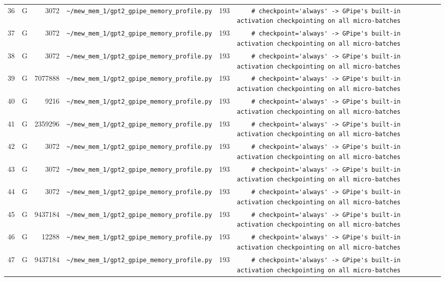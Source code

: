 \documentclass{article}
\begin{document}
\begin{longtable}{r l r p{6.5cm} r p{7.0cm}}
36 & G & 3072 & \lstinline|~/mew_mem_1/gpt2_gpipe_memory_profile.py| & 193 & \lstinline|    # checkpoint='always' -> GPipe's built-in activation checkpointing on all micro-batches| \\
37 & G & 3072 & \lstinline|~/mew_mem_1/gpt2_gpipe_memory_profile.py| & 193 & \lstinline|    # checkpoint='always' -> GPipe's built-in activation checkpointing on all micro-batches| \\
38 & G & 3072 & \lstinline|~/mew_mem_1/gpt2_gpipe_memory_profile.py| & 193 & \lstinline|    # checkpoint='always' -> GPipe's built-in activation checkpointing on all micro-batches| \\
39 & G & 7077888 & \lstinline|~/mew_mem_1/gpt2_gpipe_memory_profile.py| & 193 & \lstinline|    # checkpoint='always' -> GPipe's built-in activation checkpointing on all micro-batches| \\
40 & G & 9216 & \lstinline|~/mew_mem_1/gpt2_gpipe_memory_profile.py| & 193 & \lstinline|    # checkpoint='always' -> GPipe's built-in activation checkpointing on all micro-batches| \\
41 & G & 2359296 & \lstinline|~/mew_mem_1/gpt2_gpipe_memory_profile.py| & 193 & \lstinline|    # checkpoint='always' -> GPipe's built-in activation checkpointing on all micro-batches| \\
42 & G & 3072 & \lstinline|~/mew_mem_1/gpt2_gpipe_memory_profile.py| & 193 & \lstinline|    # checkpoint='always' -> GPipe's built-in activation checkpointing on all micro-batches| \\
43 & G & 3072 & \lstinline|~/mew_mem_1/gpt2_gpipe_memory_profile.py| & 193 & \lstinline|    # checkpoint='always' -> GPipe's built-in activation checkpointing on all micro-batches| \\
44 & G & 3072 & \lstinline|~/mew_mem_1/gpt2_gpipe_memory_profile.py| & 193 & \lstinline|    # checkpoint='always' -> GPipe's built-in activation checkpointing on all micro-batches| \\
45 & G & 9437184 & \lstinline|~/mew_mem_1/gpt2_gpipe_memory_profile.py| & 193 & \lstinline|    # checkpoint='always' -> GPipe's built-in activation checkpointing on all micro-batches| \\
46 & G & 12288 & \lstinline|~/mew_mem_1/gpt2_gpipe_memory_profile.py| & 193 & \lstinline|    # checkpoint='always' -> GPipe's built-in activation checkpointing on all micro-batches| \\
47 & G & 9437184 & \lstinline|~/mew_mem_1/gpt2_gpipe_memory_profile.py| & 193 & \lstinline|    # checkpoint='always' -> GPipe's built-in activation checkpointing on all micro-batches| \\

\end{longtable}
\end{document}
